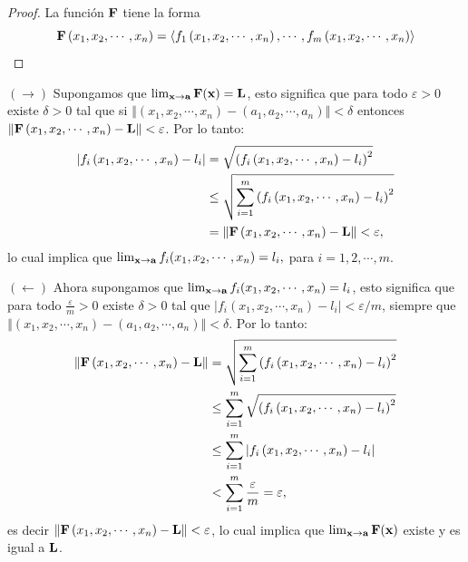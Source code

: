 \begin{proof}
  La función $\mathbf{F}$ tiene la forma
  \[\mathbf{F}\left( x_{1},x_{2},\cdots ,x_{n}\right) =\left\langle f_{1}\left( x_{1},x_{2},\cdots ,x_{n}\right) ,\cdots ,f_{m}\left( x_{1},x_{2},\cdots ,x_{n}\right)\right\rangle \]
\end{proof}
\begin{parrafoitemize}

\item $(\to)$ Supongamos que $\lim_{{\bf x}\to {\bf a}}\mathbf{F}({\bf x})= \mathbf{L}$,
  esto significa que para todo $\varepsilon >0$ existe $\delta >0$  tal que si
  $\left\Vert\left( x_{1},x_{2},\cdots ,x_{n}\right) -\left( a_{1},a_{2},\cdots ,a_{n}\right) \right\Vert <\delta $
  entonces $\left\Vert \mathbf{F}\left( x_{1},x_{2},\cdots ,x_{n}\right) -\mathbf{L}\right\Vert <\varepsilon $. Por lo tanto:
  \begin{align*}
    \left\vert f_{i}\left( x_{1},x_{2},\cdots ,x_{n}\right) -l_{i}\right\vert &=
    \sqrt{\left( f_{i}\left( x_{1},x_{2},\cdots ,x_{n}\right) -l_{i}\right) ^{2}} \\
    &\leq \sqrt{\sum_{i=1}^{m}\left( f_{i}\left(x_{1},x_{2},\cdots ,x_{n}\right) -l_{i}\right) ^{2}} \\
    &= \left\Vert \mathbf{F}\left( x_{1},x_{2},\cdots ,x_{n}\right) -\mathbf{L}\right\Vert <\varepsilon,
  \end{align*}
  lo cual implica que $\lim_{{\bf x}\to {\bf a}} f_{i}(x_{1},x_{2},\cdots ,x_{n})=l_i, $
  para $i=1,2, \cdots, m. $

\item $(\leftarrow)$ Ahora supongamos que $\lim_{{\bf x}\to {\bf a}} f_{i}(x_{1},x_{2},\cdots ,x_{n})=l_i$,
  esto significa que para todo $\frac{\varepsilon}{m}>0$ existe $\delta>0$ tal que
  $|f_i( x_{1},x_{2},\cdots ,x_{n}) -l_i| <\varepsilon/m $, siempre que
  $\left\Vert\left( x_{1},x_{2},\cdots ,x_{n}\right) -\left( a_{1},a_{2},\cdots ,a_{n}\right) \right\Vert <\delta $.
  Por lo tanto:
  \begin{gather*}
    \begin{aligned}
      \left\Vert \mathbf{F}\left( x_{1},x_{2},\cdots ,x_{n}\right) - \mathbf{L}\right\Vert &=
      \sqrt{\sum_{i=1}^{m}\left( f_{i}\left(x_{1},x_{2},\cdots ,x_{n}\right) -l_{i}\right) ^{2}} \\
      &\leq  \sum_{i=1}^{m}\sqrt{\left( f_{i}\left( x_{1},x_{2},\cdots ,x_{n}\right)-l_{i}\right) ^{2}}\\
      &\leq \sum_{i=1}^{m}\left\vert f_{i}\left( x_{1},x_{2},\cdots ,x_{n}\right)-l_{i} \right\vert\\
      & < \sum_{i=1}^{m}\frac{\varepsilon }{m}=\varepsilon,
    \end{aligned}
  \end{gather*}
  es decir $\left\Vert \mathbf{F}\left( x_{1},x_{2},\cdots ,x_{n}\right) -\mathbf{L}\right\Vert <\varepsilon $,
  lo cual implica que $\lim_{{\bf x}\to {\bf a}}\mathbf{F}({\bf x})$ existe y es igual a $\mathbf{L}$.
\end{parrafoitemize}

